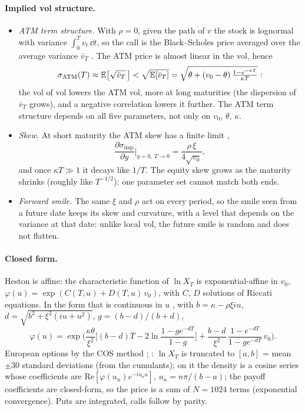 \paragraph{Implied vol structure.}
\begin{itemize}[nosep]
  \item \emph{ATM term structure.} With $\rho = 0$, given the path of $v$ the stock is lognormal with variance $\int_0^T v_t\,\dd t$, so
        the call is the Black--Scholes price averaged over the average variance $\bar v_T$ \citep{hull1987}. The ATM price is
        almost linear in the vol, hence
        \[
          \sigma_{\mathrm{ATM}}(T) \approx \mathbb{E}\big[\sqrt{\bar v_T}\,\big] < \sqrt{\mathbb{E}[\bar v_T]} = \sqrt{\theta + (v_0 - \theta)\,\tfrac{1 - e^{-\kappa T}}{\kappa T}} :
        \]
        the vol of vol lowers the ATM vol, more at long maturities (the dispersion of $\bar v_T$ grows), and a negative
        correlation lowers it further. The ATM term structure depends on all five parameters, not only on $v_0$, $\theta$, $\kappa$.
  \item \emph{Skew.} At short maturity the ATM skew has a finite limit \citep[ch.~3]{gatheral2006},
        \[
          \frac{\partial\sigma_{\mathrm{imp}}}{\partial y}\Big|_{y = 0,\ T \to 0} = \frac{\rho\,\xi}{4\sqrt{v_0}},
        \]
        and once $\kappa T \gg 1$ it decays like $1/T$. The equity skew grows as the maturity shrinks (roughly like $T^{-1/2}$):
        one parameter set cannot match both ends.
  \item \emph{Forward smile.} The same $\xi$ and $\rho$ act on every period, so the smile seen from a future date keeps its
        skew and curvature, with a level that depends on the variance at that date: unlike local vol, the future smile is
        random and does not flatten.
\end{itemize}

\paragraph{Closed form.} Heston is affine: the characteristic function of $\ln X_T$ is exponential-affine in $v_0$,
$\varphi(u) = \exp(C(T, u) + D(T, u)\,v_0)$, with $C$, $D$ solutions of Riccati equations. In the form that is continuous in $u$
\citep{albrecher2007}, with $b = \kappa - \rho\xi iu$, $d = \sqrt{b^2 + \xi^2(iu + u^2)}$, $g = (b-d)/(b+d)$,
\[
  \varphi(u) = \exp\Big(\frac{\kappa\theta}{\xi^2}\Big[(b-d)T - 2\ln\frac{1 - g e^{-dT}}{1-g}\Big]
  + \frac{b-d}{\xi^2}\,\frac{1 - e^{-dT}}{1 - g e^{-dT}}\,v_0\Big).
\]
European options by the COS method \citep{fang2008}; \citet[sec.~8.4.1]{oosterlee2019}: $\ln X_T$ is truncated to $[a, b]$ = mean $\pm 30$ standard deviations
(from the cumulants); on it the density is a cosine series whose coefficients are $\mathrm{Re}[\varphi(u_n)e^{-iu_n a}]$,
$u_n = n\pi/(b - a)$; the payoff coefficients are closed-form, so the price is a sum of $N = 1024$ terms (exponential
convergence). Puts are integrated, calls follow by parity.

